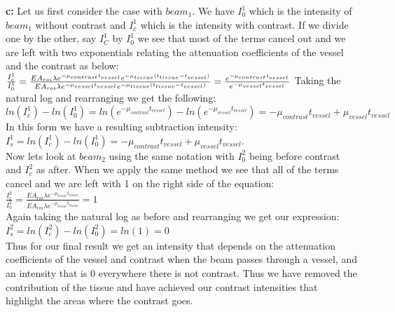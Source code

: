 \documentclass[12pt]{article}
\begin{document}
\noindent\textbf{c: }
Let us first consider the case with $beam_1$. We have $I_0^1$ which is the intensity of $beam_1$ without contrast and $I_c^1$ which is the intensity with contrast. If we divide one by the other, say $I_C^1$ by $I_0^1$ we see that most of the terms cancel out and we are left with two exponentials relating the attenuation coefficients of the vessel and the contrast as below:\\
$\frac{I_c^1}{I_0^1} = \frac{EA_{roi}\lambda e^{-\mu_{contrast}t_{vessel}}e^{-\mu\\
		_{tissue}(t_{tissue}-t_{vessel})}}{EA_{roi}\lambda e^{-\mu_{vessel}t_{vessel}}e^{-\mu_{tissue}(t_{tissue}-t_{vessel})}} = \frac{e^{-\mu_{contrast}t_{vessel}}}{e^{-\mu_{vessel}t_{vessel}}}$
Taking the natural log and rearranging we get the following:\\
$ln(I_c^1) - ln(I_0^1) = ln(e^{-\mu_{contrast}t_{vessel}}) - ln(e^{-\mu_{vessel}t_{vessel}}) = -\mu_{contrast}t_{vessel}+\mu_{vessel}t_{vessel}$\\
In this form we have a resulting subtraction intensity:\\
$I_s^1 = ln(I_c^1) - ln(I_0^1) = -\mu_{contrast}t_{vessel}+\mu_{vessel}t_{vessel}$.\\
Now lets look at $beam_2$ using the same notation with $I_0^2$ being before contrast and $I_c^2$ as after. When we apply the same method we see that all of the terms cancel and we are left with 1 on the right side of the equation:\\
$\frac{I_c^2}{I_0^2} = \frac{EA_{roi}\lambda e^{-\mu_{tissue}t_{tissue}}}{EA_{roi}\lambda e^{-\mu_{tissue}t_{tissue}}} = 1$\\
Again taking the natural log as before and rearranging we get our expression:\\
$I_s^2 = ln(I_c^2) - ln(I_0^2) = ln(1) = 0$\\
Thus for our final result we get an intensity that depends on the attenuation coefficients of the vessel and contrast when the beam passes through a vessel, and an intensity that is 0 everywhere there is not contrast. Thus we have removed the contribution of the tissue and have achieved our contrast intensities that highlight the areas where the contrast goes.
\end{document}

